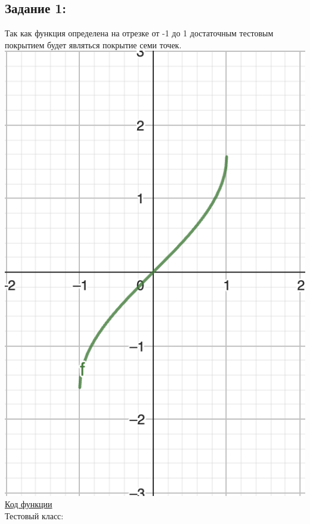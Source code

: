 \subsection{Задание 1:}
\hypertarget{p2}{}
Так как функция определена на отрезке от -1 до 1
достаточным тестовым покрытием будет являться покрытие семи точек.\\
\includegraphics[scale=0.5]{img/tpo1.png}\\
\href{https://github.com/FooolyHARD/Testing-of-Software/blob/36b94ca08662f3774ab9c1f42c43fd15b8e00945/src/main/java/org/senechka/task1/Arcsin.java#L1}{Код функции}\\
Тестовый класс:

\newpage

